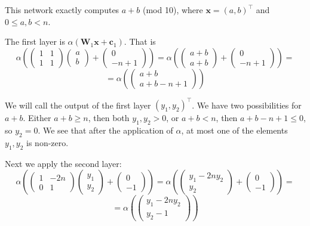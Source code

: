This network exactly computes $a+b$ (mod 10), where $\textbf{x}=(a,b)^\top$ and $0\leq a,b<n$.

The first layer is $\alpha(\textbf{W}_1\textbf{x}+\textbf{c}_1)$. That is 
$$\alpha\left(
\left(\begin{matrix}
		1 & 1\\
		1 & 1
	\end{matrix}\right)
\left(\begin{matrix}
	a\\
	b
\end{matrix}\right)
+
\left(\begin{matrix}
	0\\
	-n+1
\end{matrix}\right)
\right)
=
\alpha\left(
\left(\begin{matrix}
	a+b\\
	a+b
\end{matrix}\right)
+
\left(\begin{matrix}
	0\\
	-n+1
\end{matrix}\right)
\right)
=$$
$$=
\alpha\left(
\left(\begin{matrix}
	a+b\\
	a+b-n+1
\end{matrix}\right)
\right)
$$

We will call the output of the first layer $(y_1,y_2)^\top$. We have two possibilities for $a+b$. Either $a+b\geq n$, then both $y_1,y_2> 0$, or $a+b< n$, then $a+b-n+1\leq 0$, so $y_2=0$. We see that after the application of $\alpha$, at most one of the elements $y_1,y_2$ is non-zero. 

Next we apply the second layer: 
$$\alpha\left(
\left(\begin{matrix}
		1 & -2n\\
		0 & 1
	\end{matrix}\right)
\left(\begin{matrix}
	y_1\\
	y_2
\end{matrix}\right)
+
\left(\begin{matrix}
	0\\
	-1
\end{matrix}\right)
\right)
=
\alpha\left(
\left(\begin{matrix}
	y_1-2ny_2\\
	y_2
\end{matrix}\right)
+
\left(\begin{matrix}
	0\\
	-1
\end{matrix}\right)
\right)
=$$
$$=
\alpha\left(
\left(\begin{matrix}
	y_1-2ny_2\\
	y_2-1
\end{matrix}\right)
\right)
$$

